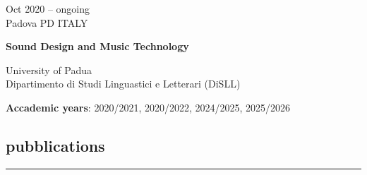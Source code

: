 \documentclass[7pt,a4paper]{article}
\begin{document}
\begin{mdframed}[
    backgroundcolor=entrygray,
    linecolor=entrygray,
    linewidth=0pt,
    innerleftmargin=6pt,
    innerrightmargin=6pt,
    innertopmargin=6pt,
    innerbottommargin=6pt,
    skipabove=0pt,
    skipbelow=0pt
]


\begin{minipage}[t]{0.28\textwidth}
\vspace{0pt}

Oct 2020 – ongoing
\\
\scriptsize Padova PD ITALY

\end{minipage}
\begin{minipage}[t]{0.68\textwidth}
\vspace{0pt}

\textbf{\normalsize Sound Design and Music Technology}


\par University of Padua
\\\small Dipartimento di Studi Linguastici e Letterari (DiSLL)





\scriptsize \textbf{Accademic years}: 2020/2021, 2020/2022, 2024/2025, 2025/2026

\end{minipage}

\vspace{0.25cm}
\end{mdframed}




\subsection*{pubblications}
\vspace{-0.5cm}
\rule{\textwidth}{0.4pt}
\vspace{0.1cm}
\end{document}
